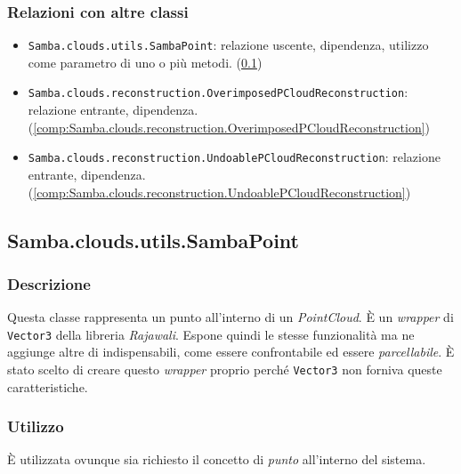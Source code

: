 \subsubsection{Relazioni con altre classi}
\begin{itemize}
	\item \texttt{Samba.clouds.utils.SambaPoint}: relazione uscente, dipendenza, utilizzo come parametro di uno o più metodi. (\ref{comp:Samba.clouds.utils.SambaPoint})
	\item \texttt{Samba.clouds.reconstruction.OverimposedPCloudReconstruction}: relazione entrante, dipendenza. (\ref{comp:Samba.clouds.reconstruction.OverimposedPCloudReconstruction})
	\item \texttt{Samba.clouds.reconstruction.UndoablePCloudReconstruction}: relazione entrante, dipendenza.	 (\ref{comp:Samba.clouds.reconstruction.UndoablePCloudReconstruction})
\end{itemize}

\subsection{Samba.clouds.utils.SambaPoint}\label{comp:Samba.clouds.utils.SambaPoint}
\subsubsection{Descrizione}
Questa classe rappresenta un punto all'interno di un \emph{PointCloud}. È un \emph{wrapper} di \texttt{Vector3} della libreria \emph{Rajawali}. Espone quindi le stesse funzionalità ma ne aggiunge altre di indispensabili, come essere confrontabile ed essere \emph{parcellabile}. È stato scelto di creare questo \emph{wrapper} proprio perché \texttt{Vector3} non forniva queste caratteristiche.
\subsubsection{Utilizzo}
È utilizzata ovunque sia richiesto il concetto di \emph{punto} all'interno del sistema.
